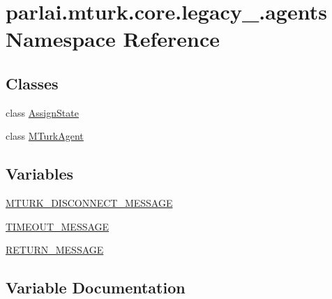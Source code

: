 \hypertarget{namespaceparlai_1_1mturk_1_1core_1_1legacy__2018_1_1agents}{}\section{parlai.\+mturk.\+core.\+legacy\+\_.\+agents Namespace Reference}
\label{namespaceparlai_1_1mturk_1_1core_1_1legacy__2018_1_1agents}
\subsection*{Classes}
\begin{DoxyCompactItemize}
\item 
class \hyperlink{classparlai_1_1mturk_1_1core_1_1legacy__2018_1_1agents_1_1AssignState}{Assign\+State}
\item 
class \hyperlink{classparlai_1_1mturk_1_1core_1_1legacy__2018_1_1agents_1_1MTurkAgent}{M\+Turk\+Agent}
\end{DoxyCompactItemize}
\subsection*{Variables}
\begin{DoxyCompactItemize}
\item 
\hyperlink{namespaceparlai_1_1mturk_1_1core_1_1legacy__2018_1_1agents_aabfef0775946c111147cf3c681ce4392}{M\+T\+U\+R\+K\+\_\+\+D\+I\+S\+C\+O\+N\+N\+E\+C\+T\+\_\+\+M\+E\+S\+S\+A\+GE}
\item 
\hyperlink{namespaceparlai_1_1mturk_1_1core_1_1legacy__2018_1_1agents_a95240767d674e5a8a76d7b59f98b3c44}{T\+I\+M\+E\+O\+U\+T\+\_\+\+M\+E\+S\+S\+A\+GE}
\item 
\hyperlink{namespaceparlai_1_1mturk_1_1core_1_1legacy__2018_1_1agents_aaec9c11a73bce456051ad5fba788b2fe}{R\+E\+T\+U\+R\+N\+\_\+\+M\+E\+S\+S\+A\+GE}
\end{DoxyCompactItemize}


\subsection{Variable Documentation}
\mbox{\label{namespaceparlai_1_1mturk_1_1core_1_1legacy__2018_1_1agents_aabfef0775946c111147cf3c681ce4392}} 
